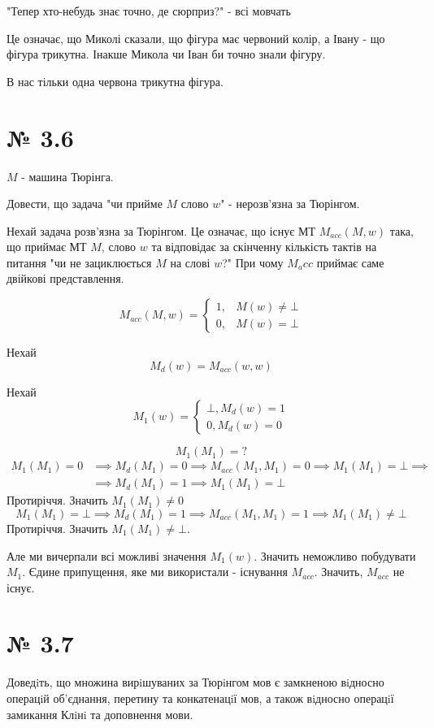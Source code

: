 \documentclass[11pt, a4paper]{article} %
\begin{document}
"Тепер хто-небудь знає точно, де сюрприз?" - всі мовчать

Це означає, що Миколі сказали, що фігура має червоний колір, а Івану - що фігура трикутна. 
Інакше Микола чи Іван би точно знали фігуру.

В нас тільки одна червона трикутна фігура.

\section*{№ 3.6}
\begin{mdframed}
    $M$ -  машина Тюрінга.

    Довести, що задача "чи прийме $M$ слово $w$" - нерозв'язна за Тюрінгом.
\end{mdframed}

Нехай задача розв'язна за Тюрінгом. 
Це означає, що існує МТ $M_{acc}(M,w)$ така, що приймає МТ $M$, слово $w$ та відповідає за скінченну кількість тактів на питання "чи не зациклюється $M$ на слові $w$?"
При чому $M_acc$ приймає саме двійкові представлення.

$$M_{acc}(M, w) = \begin{cases}
    1 , & M(w) \ne \bot\\
    0 , & M(w) = \bot
\end{cases}$$

Нехай $$M_d(w) = M_{acc}(w, w)$$

Нехай $$M_1(w) = \begin{cases}
    \bot, M_d(w) = 1\\
    0, M_d(w) = 0
\end{cases}$$

$$M_1(M_1) = ?$$
\begin{align*}
    M_1(M_1) = 0 &\implies M_d(M_1) = 0 \implies M_{acc}(M_1, M_1) = 0 \implies M_1(M_1) = \bot \implies \\
& \implies  M_d(M_1) = 1 \implies M_1(M_1) = \bot
\end{align*}
Протиріччя. Значить $M_1(M_1) \ne 0$
$$M_1(M_1) = \bot \implies M_d(M_1) = 1 \implies M_{acc}(M_1,M_1) = 1 \implies M_1(M_1) \ne \bot$$
Протиріччя. Значить $M_1(M_1) \ne \bot$.

Але ми вичерпали всі можливі значення $M_1(w)$. Значить неможливо побудувати $M_1$.
Єдине припущення, яке ми використали - існування $M_{acc}$. Значить, $M_{acc}$ не існує.
\qedsymbol

\section*{№ 3.7}
\begin{mdframed}
    Доведiть, що множина вирiшуваних за Тюрiнгом мов є замкненою вiдносно
операцiй об’єднання, перетину та конкатенацiї мов, а також вiдносно операцiї
замикання Клiнi та доповнення мови.
\end{mdframed}
\end{document}

